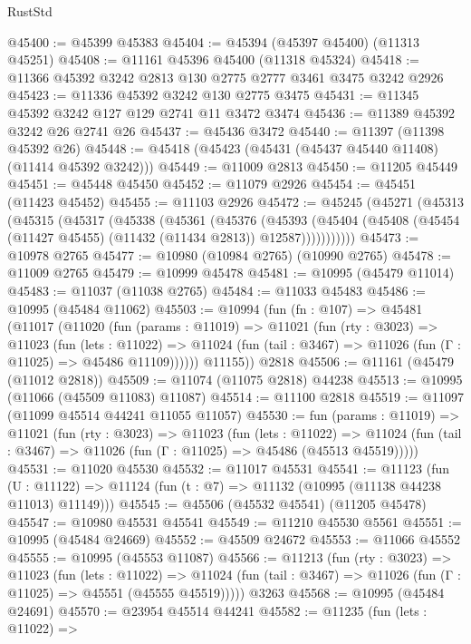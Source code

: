 \begin{lexlean}{RustStd}
\begin{coremodule}
@45400 := @45399 @45383
@45404 := @45394 (@45397 @45400) (@11313 @45251)
@45408 := @11161 @45396 @45400 (@11318 @45324)
@45418 := @11366 @45392 @3242 @2813 @130 @2775 @2777 @3461 @3475 @3242 @2926
@45423 := @11336 @45392 @3242 @130 @2775 @3475
@45431 := @11345 @45392 @3242 @127 @129 @2741 @11 @3472 @3474
@45436 := @11389 @45392 @3242 @26 @2741 @26
@45437 := @45436 @3472
@45440 := @11397 (@11398 @45392 @26)
@45448 := @45418 (@45423 (@45431 (@45437 @45440 @11408) (@11414 @45392 @3242)))
@45449 := @11009 @2813
@45450 := @11205 @45449
@45451 := @45448 @45450
@45452 := @11079 @2926
@45454 := @45451 (@11423 @45452)
@45455 := @11103 @2926
@45472 := @45245
    (@45271
      (@45313
        (@45315
          (@45317
            (@45338
              (@45361
                (@45376
                  (@45393
                    (@45404
                      (@45408 (@45454 (@11427 @45455) (@11432 (@11434 @2813)) @12587)))))))))))
@45473 := @10978 @2765
@45477 := @10980 (@10984 @2765) (@10990 @2765)
@45478 := @11009 @2765
@45479 := @10999 @45478
@45481 := @10995 (@45479 @11014)
@45483 := @11037 (@11038 @2765)
@45484 := @11033 @45483
@45486 := @10995 (@45484 @11062)
@45503 := @10994
    (fun (fn : @107) =>
    @45481
      (@11017
        (@11020
          (fun (params : @11019) =>
          @11021
            (fun (rty : @3023) =>
            @11023
              (fun (lets : @11022) =>
              @11024 (fun (tail : @3467) => @11026 (fun (Γ : @11025) => @45486 @11109))))))
        @11155))
    @2818
@45506 := @11161 (@45479 (@11012 @2818))
@45509 := @11074 (@11075 @2818) @44238
@45513 := @10995 (@11066 (@45509 @11083) @11087)
@45514 := @11100 @2818
@45519 := @11097 (@11099 @45514 @44241 @11055 @11057)
@45530 := fun (params : @11019) =>
  @11021
    (fun (rty : @3023) =>
    @11023
      (fun (lets : @11022) =>
      @11024 (fun (tail : @3467) => @11026 (fun (Γ : @11025) => @45486 (@45513 @45519)))))
@45531 := @11020 @45530
@45532 := @11017 @45531
@45541 := @11123
    (fun (U : @11122) => @11124 (fun (t : @7) => @11132 (@10995 (@11138 @44238 @11013) @11149)))
@45545 := @45506 (@45532 @45541) (@11205 @45478)
@45547 := @10980 @45531 @45541
@45549 := @11210 @45530 @5561
@45551 := @10995 (@45484 @24669)
@45552 := @45509 @24672
@45553 := @11066 @45552
@45555 := @10995 (@45553 @11087)
@45566 := @11213
    (fun (rty : @3023) =>
    @11023
      (fun (lets : @11022) =>
      @11024 (fun (tail : @3467) => @11026 (fun (Γ : @11025) => @45551 (@45555 @45519)))))
    @3263
@45568 := @10995 (@45484 @24691)
@45570 := @23954 @45514 @44241
@45582 := @11235
    (fun (lets : @11022) =>

\end{coremodule}
\end{lexlean}
